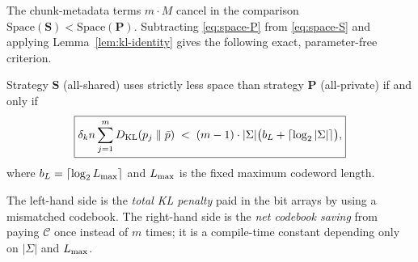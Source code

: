 The chunk-metadata terms $m \cdot M$ cancel in the comparison
$\mathrm{Space}(\mathbf{S}) < \mathrm{Space}(\mathbf{P})$. Subtracting
\eqref{eq:space-P} from \eqref{eq:space-S} and applying Lemma~\ref{lem:kl-identity}
gives the following exact, parameter-free criterion.

\begin{proposition}\label{prop:criterion}
    Strategy $\mathbf{S}$ (all-shared) uses strictly less space than strategy
    $\mathbf{P}$ (all-private) if and only if
    \[
        \boxed{
            \delta_k n \sum_{j=1}^{m}D_{\mathrm{KL}}\!\left(p_j \;\middle\|\; \bar{p}\right)
            \;<\;
            (m-1)\cdot|\Sigma|\bigl(b_L + \lceil\log_2|\Sigma|\rceil\bigr),
        }
    \]
    where $b_L = \lceil\log_2 L_{\max}\rceil$ and $L_{\max}$ is the fixed maximum codeword
    length.
\end{proposition}

The left-hand side is the \emph{total KL penalty} paid in the bit arrays by using a
mismatched codebook. The right-hand side is the \emph{net codebook saving} from paying
$\mathcal{C}$ once instead of $m$ times; it is a compile-time constant depending only
on $|\Sigma|$ and $L_{\max}$.